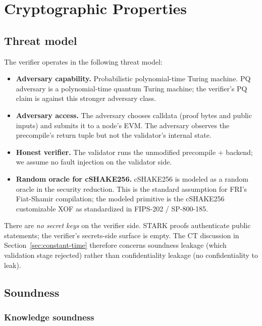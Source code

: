 \section{Cryptographic Properties}
\label{sec:cryptographic-properties}

\subsection{Threat model}

The verifier operates in the following threat model:

\begin{itemize}[leftmargin=2em,nosep]
\item \textbf{Adversary capability.} Probabilistic polynomial-time
  Turing machine. PQ adversary is a polynomial-time quantum Turing
  machine; the verifier's PQ claim is against this stronger
  adversary class.
\item \textbf{Adversary access.} The adversary chooses calldata
  (proof bytes and public inputs) and submits it to a node's EVM.
  The adversary observes the precompile's return tuple but not the
  validator's internal state.
\item \textbf{Honest verifier.} The validator runs the unmodified
  precompile + backend; we assume no fault injection on the
  validator side.
\item \textbf{Random oracle for cSHAKE256.} cSHAKE256 is modeled as
  a random oracle in the security reduction. This is the standard
  assumption for FRI's Fiat-Shamir compilation; the modeled
  primitive is the cSHAKE256 customizable XOF as standardized in
  FIPS-202 / SP-800-185.
\end{itemize}

There are \emph{no secret keys} on the verifier side. STARK proofs
authenticate public statements; the verifier's secrets-side surface
is empty. The CT discussion in Section~\ref{sec:constant-time}
therefore concerns soundness leakage (which validation stage
rejected) rather than confidentiality leakage (no confidentiality
to leak).

\subsection{Soundness}

\subsubsection{Knowledge soundness}


